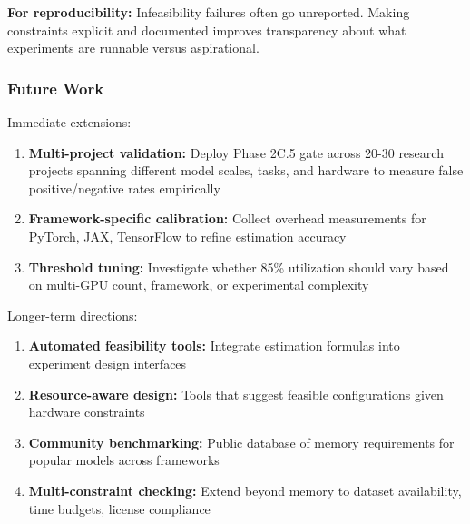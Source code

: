 \textbf{For reproducibility:} Infeasibility failures often go unreported. Making constraints explicit and documented improves transparency about what experiments are runnable versus aspirational.

\subsubsection{Future Work}

Immediate extensions:
\begin{enumerate}
\item \textbf{Multi-project validation:} Deploy Phase 2C.5 gate across 20-30 research projects spanning different model scales, tasks, and hardware to measure false positive/negative rates empirically
\item \textbf{Framework-specific calibration:} Collect overhead measurements for PyTorch, JAX, TensorFlow to refine estimation accuracy
\item \textbf{Threshold tuning:} Investigate whether 85\% utilization should vary based on multi-GPU count, framework, or experimental complexity
\end{enumerate}

Longer-term directions:
\begin{enumerate}
\item \textbf{Automated feasibility tools:} Integrate estimation formulas into experiment design interfaces
\item \textbf{Resource-aware design:} Tools that suggest feasible configurations given hardware constraints
\item \textbf{Community benchmarking:} Public database of memory requirements for popular models across frameworks
\item \textbf{Multi-constraint checking:} Extend beyond memory to dataset availability, time budgets, license compliance
\end{enumerate}
